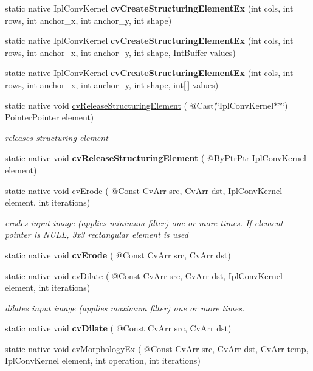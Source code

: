 \begin{DoxyCompactItemize}
static native Ipl\+Conv\+Kernel {\bfseries cv\+Create\+Structuring\+Element\+Ex} (int cols, int rows, int anchor\+\_\+x, int anchor\+\_\+y, int shape)
\item 
static native Ipl\+Conv\+Kernel {\bfseries cv\+Create\+Structuring\+Element\+Ex} (int cols, int rows, int anchor\+\_\+x, int anchor\+\_\+y, int shape, Int\+Buffer values)
\item 
static native Ipl\+Conv\+Kernel {\bfseries cv\+Create\+Structuring\+Element\+Ex} (int cols, int rows, int anchor\+\_\+x, int anchor\+\_\+y, int shape, int\mbox{[}$\,$\mbox{]} values)
\item 
static native void \hyperlink{group__imgproc__c_gaddb6b08638fde5f3641e96a7b033f774}{cv\+Release\+Structuring\+Element} ( @Cast(\char`\"{}Ipl\+Conv\+Kernel$\ast$$\ast$\char`\"{}) Pointer\+Pointer element)
\begin{DoxyCompactList}\small\item\em releases structuring element \end{DoxyCompactList}\item 
static native void {\bfseries cv\+Release\+Structuring\+Element} ( @By\+Ptr\+Ptr Ipl\+Conv\+Kernel element)
\item 
static native void \hyperlink{group__imgproc__c_ga8b958e2b5185910eba9b44400bb1d3b8}{cv\+Erode} ( @Const Cv\+Arr src, Cv\+Arr dst, Ipl\+Conv\+Kernel element, int iterations)
\begin{DoxyCompactList}\small\item\em erodes input image (applies minimum filter) one or more times. If element pointer is N\+U\+LL, 3x3 rectangular element is used \end{DoxyCompactList}\item 
static native void {\bfseries cv\+Erode} ( @Const Cv\+Arr src, Cv\+Arr dst)
\item 
static native void \hyperlink{group__imgproc__c_gae80f82cb5e9876985e59aec2267f7ad4}{cv\+Dilate} ( @Const Cv\+Arr src, Cv\+Arr dst, Ipl\+Conv\+Kernel element, int iterations)
\begin{DoxyCompactList}\small\item\em dilates input image (applies maximum filter) one or more times. \end{DoxyCompactList}\item 
static native void {\bfseries cv\+Dilate} ( @Const Cv\+Arr src, Cv\+Arr dst)
\item 
static native void \hyperlink{group__imgproc__c_ga09edd651f402b82f067e6de776bbd197}{cv\+Morphology\+Ex} ( @Const Cv\+Arr src, Cv\+Arr dst, Cv\+Arr temp, Ipl\+Conv\+Kernel element, int operation, int iterations)
$$
\end{DoxyCompactItemize}
